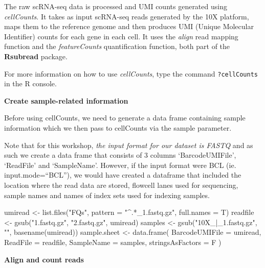 \documentclass[
  openany]{book}
\newenvironment{Shaded}{\begin{snugshade}}{\end{snugshade}}
\newcommand{\AttributeTok}[1]{\textcolor[rgb]{0.77,0.63,0.00}{#1}}
\newcommand{\FunctionTok}[1]{\textcolor[rgb]{0.00,0.00,0.00}{#1}}
\newcommand{\NormalTok}[1]{#1}
\newcommand{\OtherTok}[1]{\textcolor[rgb]{0.56,0.35,0.01}{#1}}
\newcommand{\StringTok}[1]{\textcolor[rgb]{0.31,0.60,0.02}{#1}}
\begin{document}
The raw scRNA-seq data is processed and UMI counts generated using \emph{cellCounts}. It takes as input scRNA-seq reads generated by the 10X platform, maps them to the reference genome and then produces UMI (Unique Molecular Identifier) counts for each gene in each cell. It uses the \emph{align} read mapping function and the \emph{featureCounts} quantification function, both part of the \textbf{Rsubread} package.

For more information on how to use \emph{cellCounts}, type the command \texttt{?cellCounts} in the R console.

\textbf{Create sample-related information}

Before using cellCounts, we need to generate a data frame containing sample information which we then pass to cellCounts via the sample parameter.

Note that for this workshop, \emph{the input format for our dataset is FASTQ} and as such we create a data frame that consists of 3 columns `BarcodeUMIFile', `ReadFile' and `SampleName'. However, if the input format were BCL (ie. input.mode=``BCL''), we would have created a dataframe that included the location where the read data are stored, flowcell lanes used for sequencing, sample names and names of index sets used for indexing samples.

\begin{Shaded}
\begin{Highlighting}[]
\NormalTok{umiread }\OtherTok{\textless{}{-}} \FunctionTok{list.files}\NormalTok{(}\StringTok{"FQs"}\NormalTok{,}
                      \AttributeTok{pattern =} \StringTok{"\^{}.*\_1.fastq.gz"}\NormalTok{,}
                      \AttributeTok{full.names =}\NormalTok{ T)}
\NormalTok{readfile }\OtherTok{\textless{}{-}} \FunctionTok{gsub}\NormalTok{(}\StringTok{"1.fastq.gz"}\NormalTok{, }\StringTok{"2.fastq.gz"}\NormalTok{, umiread)}
\NormalTok{samples }\OtherTok{\textless{}{-}} \FunctionTok{gsub}\NormalTok{(}\StringTok{"10X\_|\_1.fastq.gz"}\NormalTok{, }\StringTok{""}\NormalTok{, }\FunctionTok{basename}\NormalTok{(umiread))}
\NormalTok{sample.sheet }\OtherTok{\textless{}{-}}
  \FunctionTok{data.frame}\NormalTok{(}
    \AttributeTok{BarcodeUMIFile =}\NormalTok{ umiread,}
    \AttributeTok{ReadFile =}\NormalTok{ readfile,}
    \AttributeTok{SampleName =}\NormalTok{ samples,}
    \AttributeTok{stringsAsFactors =}\NormalTok{ F}
\NormalTok{  )}
\end{Highlighting}
\end{Shaded}

\textbf{Align and count reads}
\end{document}
